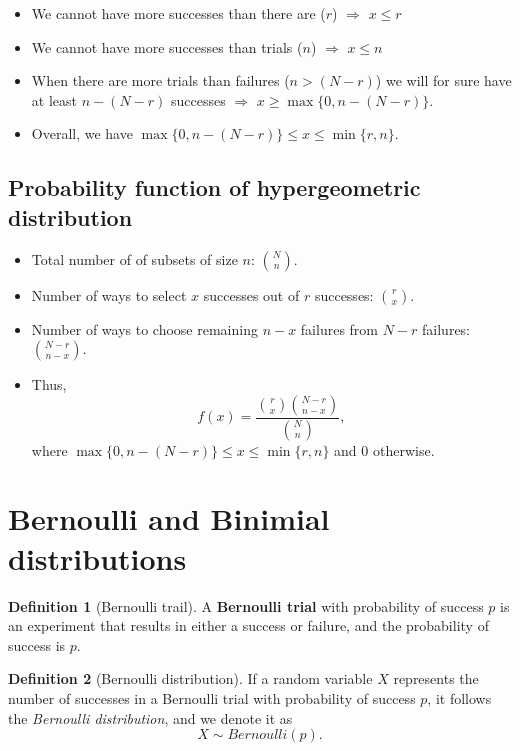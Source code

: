 \documentclass[
]{book}
\providecommand{\tightlist}{%
  \setlength{\itemsep}{0pt}\setlength{\parskip}{0pt}}
\theoremstyle{definition}
\newtheorem{definition}{Definition}[chapter]
\theoremstyle{definition}
\theoremstyle{definition}
\theoremstyle{definition}
\theoremstyle{remark}
\begin{document}
\begin{itemize}
\tightlist
\item
  We cannot have more successes than there are (\(r\)) \(\Rightarrow\) \(x\leq r\)
\item
  We cannot have more successes than trials (\(n\)) \(\Rightarrow\) \(x\leq n\)
\item
  When there are more trials than failures (\(n>(N-r)\)) we will for sure have at least \(n-(N-r)\) successes \(\Rightarrow\) \(x\geq \max\{0, n-(N-r)\}\).
\item
  Overall, we have \textbf{\(\max\{0, n-(N-r)\} \leq x \leq \min\{r,n\}\)}.
\end{itemize}

\subsection{Probability function of hypergeometric distribution}\label{probability-function-of-hypergeometric-distribution}

\begin{itemize}
\tightlist
\item
  Total number of of subsets of size \(n\): \(\binom{N}{n}\).
\item
  Number of ways to select \(x\) successes out of \(r\) successes: \(\binom{r}{x}\).
\item
  Number of ways to choose remaining \(n-x\) failures from \(N-r\) failures: \(\binom{N-r}{n-x}\).
\item
  Thus,
  \[f(x) = \frac{\binom{r}{x}\binom{N-r}{n-x}}{\binom{N}{n}},\]
  where \(\max\{0, n-(N-r)\} \leq x \leq \min\{r,n\}\) and 0 otherwise.
\end{itemize}

\section{Bernoulli and Binimial distributions}\label{bernoulli-and-binimial-distributions}

\begin{definition}[Bernoulli trail]
A \textbf{Bernoulli trial} with probability of success \(p\) is an experiment that results in either a success or failure, and the probability of success is \(p\).
\end{definition}

\begin{definition}[Bernoulli distribution]
If a random variable \(X\) represents the number of successes in a Bernoulli trial with probability of success \(p\), it follows the \emph{Bernoulli distribution}, and we denote it as
\[
X \sim Bernoulli(p).
\]
\end{definition}
\end{document}
